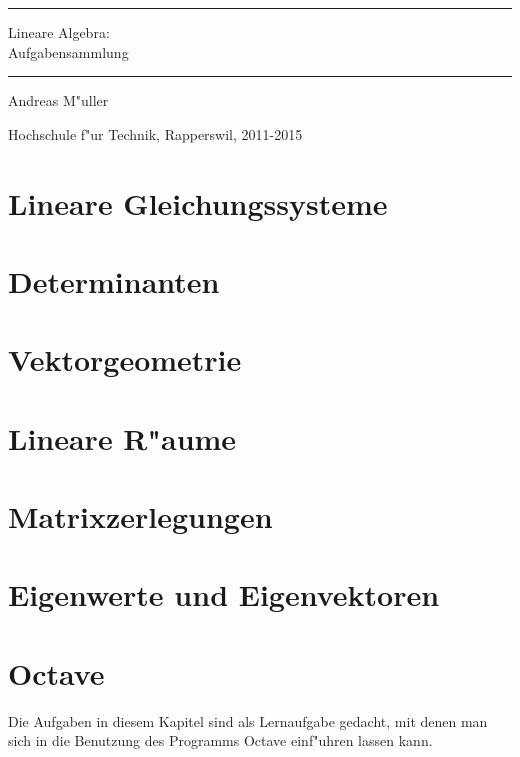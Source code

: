\documentclass[a4paper,12pt]{book}
\begin{document}
\pagestyle{fancy}
\rhead{}
\frontmatter
\newcommand\HRule{\noindent\rule{\linewidth}{1.5pt}}
\begin{titlepage}
\HRule
\vspace*{2pt}
\begin{flushright}
{\Huge
Lineare Algebra:\\
\bigskip
Aufgabensammlung}
\end{flushright}
\HRule
\begin{flushright}
\vspace{30pt}
\LARGE
Andreas M"uller
\end{flushright}
\begin{center}
Hochschule f"ur Technik, Rapperswil, 2011-2015
\end{center}
\end{titlepage}
\tableofcontents
\newenvironment{beispiel}[1][Beispiel]{%
\begin{proof}[#1]%
\renewcommand{\qedsymbol}{$\bigcirc$}
}{\end{proof}}
\mainmatter



\chapter{Lineare Gleichungssysteme}

\chapter{Determinanten}

\chapter{Vektorgeometrie}

\chapter{Lineare R"aume}

\chapter{Matrixzerlegungen}

\chapter{Eigenwerte und Eigenvektoren}

\chapter{Octave}
Die Aufgaben in diesem Kapitel sind als Lernaufgabe gedacht, mit denen
man sich in die Benutzung des Programms Octave einf"uhren lassen kann.

\bigskip


\end{document}
